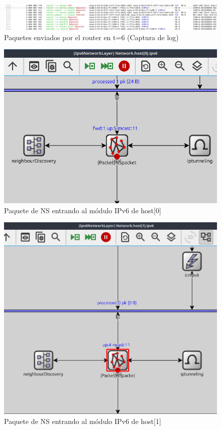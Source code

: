 \begin{figure}[H]
    \centering
    \includegraphics[width=135mm, scale=0.75]{imaxes/ejercicio3_10_1.png}
    \caption{Paquetes enviados por el router en t=6 (Captura de log)}
    \label{fig:ns_logs}
\end{figure}

\begin{figure}[H]
    \centering
    \includegraphics[width=135mm, scale=0.75]{imaxes/ejercicio3_10_2.png}
    \caption{Paquete de NS entrando al módulo IPv6 de host[0]}
    \label{fig:ns_ipv6_host0}
\end{figure}

\begin{figure}[H]
    \centering
    \includegraphics[width=135mm, scale=0.75]{imaxes/ejercicio3_10_3.png}
    \caption{Paquete de NS entrando al módulo IPv6 de host[1]}
    \label{fig:ns_ipv6_host1}
\end{figure}

